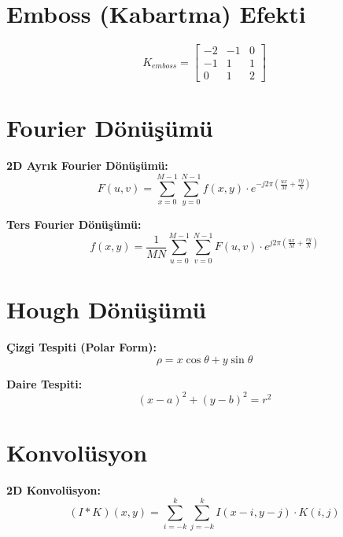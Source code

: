 \documentclass[12pt,a4paper]{article}
\begin{document}
\section{Emboss (Kabartma) Efekti}

\begin{equation}
K_{emboss} = \begin{bmatrix} -2 & -1 & 0 \\ -1 & 1 & 1 \\ 0 & 1 & 2 \end{bmatrix}
\end{equation}

\section{Fourier Dönüşümü}

\textbf{2D Ayrık Fourier Dönüşümü:}
\begin{equation}
F(u,v) = \sum_{x=0}^{M-1} \sum_{y=0}^{N-1} f(x,y) \cdot e^{-j2\pi\left(\frac{ux}{M} + \frac{vy}{N}\right)}
\end{equation}

\textbf{Ters Fourier Dönüşümü:}
\begin{equation}
f(x,y) = \frac{1}{MN} \sum_{u=0}^{M-1} \sum_{v=0}^{N-1} F(u,v) \cdot e^{j2\pi\left(\frac{ux}{M} + \frac{vy}{N}\right)}
\end{equation}

\section{Hough Dönüşümü}

\textbf{Çizgi Tespiti (Polar Form):}
\begin{equation}
\rho = x \cos\theta + y \sin\theta
\end{equation}

\textbf{Daire Tespiti:}
\begin{equation}
(x - a)^2 + (y - b)^2 = r^2
\end{equation}

\section{Konvolüsyon}

\textbf{2D Konvolüsyon:}
\begin{equation}
(I * K)(x,y) = \sum_{i=-k}^{k} \sum_{j=-k}^{k} I(x-i, y-j) \cdot K(i,j)
\end{equation}
\end{document}
